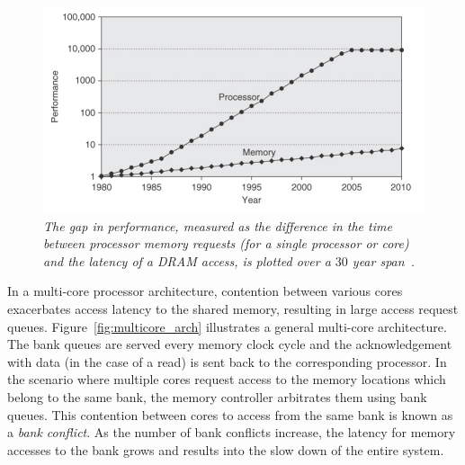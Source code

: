 \begin{figure}[t!]
\centering
\includegraphics[width=0.7\linewidth]{fig/cpuvsmemory.jpg}
\caption{\it{The gap in performance, measured as the difference in the time 
between processor memory requests (for a single processor or core) and the 
latency of a DRAM access, is plotted over a $30$ year span~\cite{comparchbook}.}}
\label{fig:cpuvsmemory}
\end{figure}
In a multi-core processor architecture, contention between various cores exacerbates access latency to the shared memory, resulting in large access request queues. 
Figure~\ref{fig:multicore_arch}  illustrates a general multi-core architecture. The bank queues are 
served every memory clock cycle and the acknowledgement with data (in the case of a 
read) is sent back to the corresponding processor. In the scenario where multiple cores request access to the memory locations which belong to the same bank, the memory controller arbitrates them using bank queues. This contention between cores to access from the same bank is known as a {\em bank conflict}. 
As the number of bank conflicts increase, the latency for memory accesses to the bank grows and results into the slow down of the entire system. \\ 
